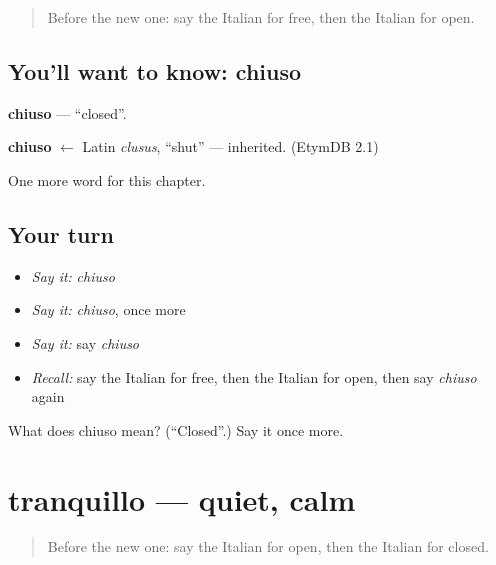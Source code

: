 \label{lesson:IT-C124-chiuso}



\begin{quote}
Before the new one: say the Italian for free, then the Italian for open.
\end{quote}

\subsection*{You'll want to know: chiuso}
\textbf{chiuso} — \textquotedblleft{}closed\textquotedblright{}.

\begin{cousinweb}
\textbf{chiuso} $\leftarrow$ Latin \emph{clusus}, \textquotedblleft{}shut\textquotedblright{} — inherited. (EtymDB 2.1)
\end{cousinweb}

\begin{grammarlens}[title={What you've built}]
One more word for this chapter.
\end{grammarlens}

\subsection*{Your turn}
\begin{itemize}
\raggedright
  \item \emph{Say it:} \emph{chiuso}
  \item \emph{Say it:} \emph{chiuso}, once more
  \item \emph{Say it:} say \emph{chiuso}
  \item \emph{Recall:} say the Italian for free, then the Italian for open, then say \emph{chiuso} again
\end{itemize}

\begin{tcolorbox}[breakable,colback=teal!4,colframe=teal!35!black,title={Before you move on}]
What does chiuso mean? (\textquotedblleft{}Closed\textquotedblright{}.) Say it once more.
\end{tcolorbox}
\section[tranquillo]{tranquillo — quiet, calm}

\label{lesson:IT-C124-tranquillo}



\begin{quote}
Before the new one: say the Italian for open, then the Italian for closed.
\end{quote}

